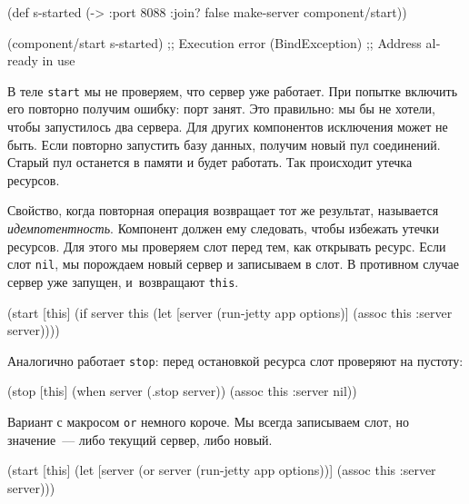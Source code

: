 \else

\begin{english}
  \begin{clojure}
(def s-started (-> {:port 8088 :join? false}
                    make-server
                    component/start))

(component/start s-started)
;; Execution error (BindException)
;; Address already in use
  \end{clojure}
\end{english}

\fi

В теле \verb|start| мы не проверяем, что сервер уже работает. При попытке
включить его повторно получим ошибку: порт занят. Это правильно: мы бы не
хотели, чтобы запустилось два сервера. Для других компонентов исключения может
не быть. Если повторно запустить базу данных, получим новый пул
соединений. Старый пул останется в памяти и будет работать. Так происходит
утечка ресурсов.


Свойство, когда повторная операция возвращает тот же результат, называется
\emph{идемпотентность}. Компонент должен ему следовать, чтобы избежать утечки
ресурсов. Для этого мы проверяем слот перед тем, как открывать ресурс. Если слот
\verb|nil|, мы порождаем новый сервер и записываем в слот. В противном случае
сервер уже запущен, и~возвращают \verb|this|.

\begin{english}
  \begin{clojure}
(start [this]
  (if server
    this
    (let [server (run-jetty app options)]
      (assoc this :server server))))
  \end{clojure}
\end{english}

\noindent
Аналогично работает \verb|stop|: перед остановкой ресурса слот проверяют на
пустоту:

\begin{english}
  \begin{clojure}
(stop [this]
  (when server
    (.stop server))
  (assoc this :server nil))
  \end{clojure}
\end{english}

Вариант с макросом \verb|or| немного короче. Мы всегда записываем слот, но
значение~--- либо текущий сервер, либо новый.

\ifnarrow

\begin{english}
  \begin{clojure}
(start [this]
  (let [server (or server
                   (run-jetty
                     app options))]
    (assoc this :server server)))
  \end{clojure}
\end{english}

